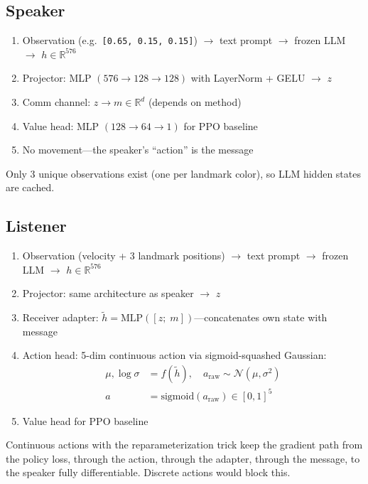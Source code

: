 \documentclass[11pt,a4paper]{article}
\begin{document}
\subsection{Speaker}

\begin{enumerate}[nosep,leftmargin=1.5em]
    \item Observation (e.g.\ \texttt{[0.65, 0.15, 0.15]}) $\to$ text prompt $\to$ frozen LLM $\to$ $h \in \mathbb{R}^{576}$
    \item Projector: MLP $(576 \to 128 \to 128)$ with LayerNorm + GELU $\to$ $z$
    \item Comm channel: $z \to m \in \mathbb{R}^d$ (depends on method)
    \item Value head: MLP $(128 \to 64 \to 1)$ for PPO baseline
    \item No movement---the speaker's ``action'' is the message
\end{enumerate}

Only 3 unique observations exist (one per landmark color), so LLM hidden states are cached.

\subsection{Listener}

\begin{enumerate}[nosep,leftmargin=1.5em]
    \item Observation (velocity + 3 landmark positions) $\to$ text prompt $\to$ frozen LLM $\to$ $h \in \mathbb{R}^{576}$
    \item Projector: same architecture as speaker $\to$ $z$
    \item Receiver adapter: $\tilde{h} = \mathrm{MLP}([z;\; m])$---concatenates own state with message
    \item Action head: 5-dim continuous action via sigmoid-squashed Gaussian:
    \begin{align}
        \mu, \log\sigma &= f(\tilde{h}), \quad a_{\mathrm{raw}} \sim \mathcal{N}(\mu, \sigma^2) \\
        a &= \mathrm{sigmoid}(a_{\mathrm{raw}}) \in [0, 1]^5
    \end{align}
    \item Value head for PPO baseline
\end{enumerate}

Continuous actions with the reparameterization trick keep the gradient path from the policy loss, through the action, through the adapter, through the message, to the speaker fully differentiable. Discrete actions would block this.
\end{document}
